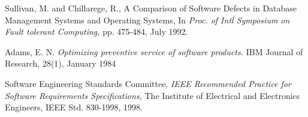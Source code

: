 \documentclass[conference]{IEEEtran}
\begin{document}
\begin{thebibliography}{1}
Sullivan, M. and Chillarege, R., A Comparison of Software Defects in Database Management Systems and Operating Systems, In \emph{Proc. of Int\'l Symposium on Fault tolerant Computing,} pp. 475-484, July 1992.

Adams, E. N.  \emph{Optimizing preventive service of software products.} IBM Journal of Research, 28(1), January 1984

Software Engineering Standards Committee, \emph{IEEE Recommended Practice for Software Requirements Specifications,} The Institute of Electrical and Electronics Engineers, IEEE Std. 830-1998, 1998.

\end{thebibliography}

\end{document}
